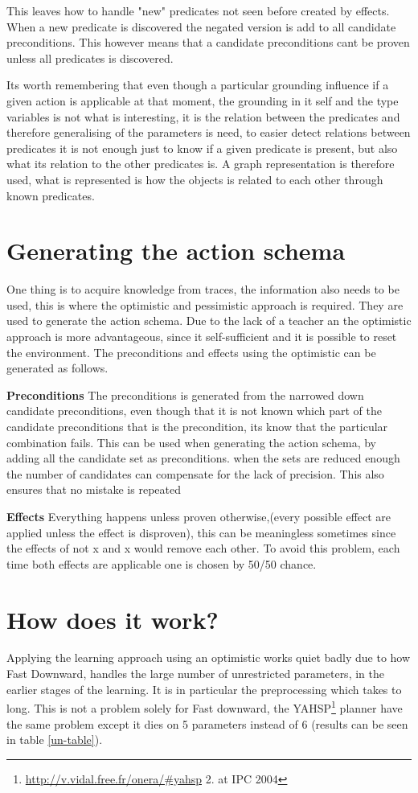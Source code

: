 	This leaves how to handle "new" predicates not seen before created by effects. When a new predicate is discovered the negated version is add to all candidate preconditions. This however means that a candidate preconditions cant be proven unless all predicates is discovered. 


	Its worth remembering that even though a particular grounding influence if a given action is applicable at that moment, the grounding in it self and the type variables is not what is interesting, it is the relation between the predicates and therefore generalising of the parameters is need, to easier detect relations between predicates it is not enough just to know if a given predicate is present, but also what its relation to the other predicates is. A graph representation is therefore used, what is represented is how the objects is related to each other through known predicates.


\section{Generating the action schema}
One thing is to acquire knowledge from traces, the information also needs to be used, this is where the optimistic and pessimistic approach is required. They are used to generate the action schema. Due to the lack of a teacher an the optimistic approach is more advantageous, since it self-sufficient and it is possible to reset the environment. The preconditions and effects using the optimistic can be generated as follows. 


\textbf{Preconditions}
The preconditions is generated from the narrowed down candidate preconditions, even though that it is not known which part of the candidate preconditions that is the precondition, its know that the particular combination fails. This can be used when generating the action schema, by adding all the candidate set as preconditions. when the sets are reduced enough the number of candidates can compensate for the lack of precision. This also ensures that no mistake is repeated


\textbf{Effects}
Everything happens unless proven otherwise,(every possible effect are applied unless the effect is disproven), this can be meaningless sometimes since the effects of not x and x would remove each other. To avoid this problem, each time both effects are applicable one is chosen by 50/50 chance.

\section{How does it work?}
\label{toFree}
Applying the learning approach using an optimistic works quiet badly due to how Fast Downward, handles the large number of unrestricted parameters, in the earlier stages of the learning. It is in particular the preprocessing which takes to long. This is not a problem solely for Fast downward, the YAHSP\footnote{\url{http://v.vidal.free.fr/onera/\#yahsp} 2. at IPC 2004} planner have the same problem except it dies on 5 parameters instead of 6 (results can be seen in  table \ref{un-table}).

